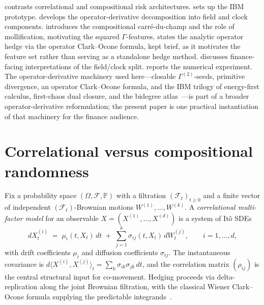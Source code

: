 \documentclass[11pt,reqno]{amsart}
\theoremstyle{plain}
\theoremstyle{definition}
\theoremstyle{remark}
\newcommand{\Prob}{\mathbb P}
\newcommand{\cF}{\mathcal F}
\begin{document}
\medskip

 contrasts correlational and
compositional risk architectures.
 sets up the IBM prototype.
 develops the operator-derivative
decomposition into field and clock components.
 introduces the compositional carr\'e-du-champ
and the role of mollification, motivating the squared
$\Gamma$-features.  states the
analytic operator hedge via the operator Clark--Ocone formula,
kept brief, as it motivates the feature set rather than serving
as a standalone hedge method.  discusses
finance-facing interpretations of the field/clock split.
 reports the numerical experiment. The
operator-derivative machinery used here---closable
$\Gamma^{(2)}$-seeds, primitive divergence, an operator
Clark--Ocone formula, and the IBM trilogy of energy-first
calculus, first-chaos dual closure, and the bidegree
atlas~\cite{GammaHierarchyDivergence,OperatorClarkOcone,EnergyFirst,FCDC,BidegreeAtlas}---is
part of a broader operator-derivative reformulation; the
present paper is one practical instantiation of that machinery
for the finance audience.

\section{Correlational versus compositional randomness}\label{sec:correl-vs-comp}

Fix a probability space $(\Omega,\cF,\Prob)$ with a filtration
$(\cF_{t})_{t\ge 0}$ and a finite vector of independent
$(\cF_{t})$-Brownian motions $W^{(1)},\ldots,W^{(k)}$. A
\emph{correlational multi-factor model} for an observable
$X=(X^{(1)},\ldots,X^{(d)})$ is a system of It\^o SDEs
\begin{equation}\label{eq:corr-SDE}
  dX^{(i)}_{t}\;=\;\mu_{i}(t,X_{t})\,dt
   \;+\;\sum_{j=1}^{k}\sigma_{ij}(t,X_{t})\,dW^{(j)}_{t},
   \qquad i=1,\ldots,d,
\end{equation}
with drift coefficients $\mu_{i}$ and diffusion coefficients
$\sigma_{ij}$. The instantaneous covariance is
$d\langle X^{(i)},X^{(j)}\rangle_{t}
 =\sum_{k}\sigma_{ik}\sigma_{jk}\,dt$, and the correlation
matrix $(\rho_{ij})$ is the central structural input for
co-movement. Hedging proceeds via delta-replication
along the joint Brownian filtration, with the classical Wiener
Clark--Ocone formula supplying the predictable
integrands~\cite[\S 7.1]{OperatorClarkOcone}.
\end{document}
